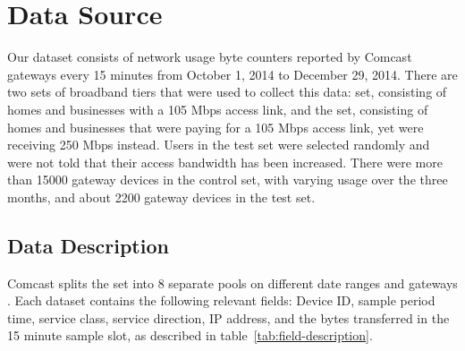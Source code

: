 \section{Data Source}
\label{sec:data}
Our dataset consists of network usage byte counters reported by Comcast gateways every 15 minutes from October 1, 2014 to December 29, 2014. There are two sets of broadband tiers that were used to collect this data: \control set, consisting of homes and businesses with a 105 Mbps access link, and the \test set, consisting of homes and businesses that were paying for a 105 Mbps access link, yet were receiving 250 Mbps instead. Users in the test set were selected randomly and were not told that their access bandwidth has been increased. There were more than 15000 gateway devices in the control set, with varying usage over the three months, and about 2200 gateway devices in the test set.


\subsection{Data Description}

Comcast splits the \control set into 8 separate pools on different date ranges and gateways . Each dataset contains the following relevant fields: Device ID, sample period time, service class, service direction, IP address, and the bytes transferred in the 15 minute sample slot, as described in table~\ref{tab:field-description}. 

